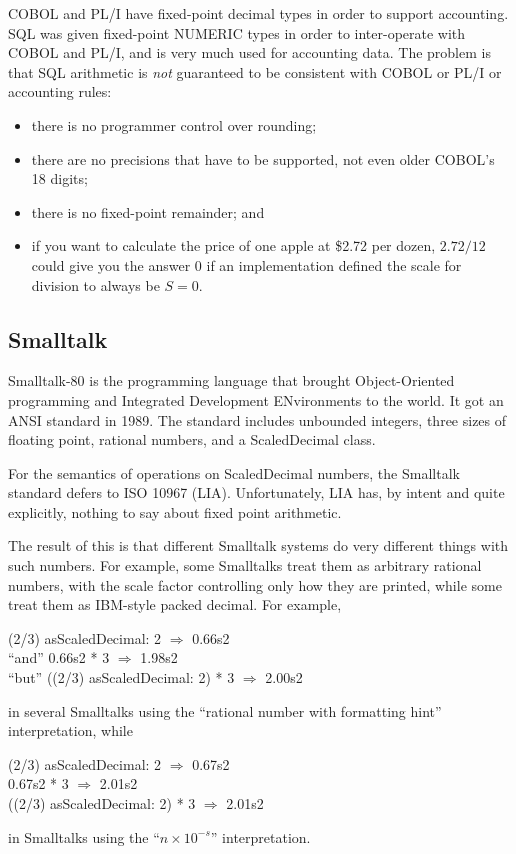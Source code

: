 \documentclass{article}
\begin{document}
COBOL and PL/I have fixed-point decimal types in order to support
accounting.
SQL was given fixed-point NUMERIC types in order to inter-operate
with COBOL and PL/I, and is very much used for accounting data.
The problem is that SQL arithmetic is {\it not} guaranteed
to be consistent with COBOL or PL/I or accounting rules:
\begin{itemize}
\item there is no programmer control over rounding;
\item there are no precisions that have to be supported,
not even older COBOL's 18 digits;
\item there is no fixed-point remainder; and
\item if you want to calculate the price of one
apple at \$2.72 per dozen, $2.72/12$ could give
you the answer 0 if an implementation defined the
scale for division to always be $S=0$.
\end{itemize}

\subsection{Smalltalk}

Smalltalk-80 is the programming language that brought Object-Oriented
programming and Integrated Development ENvironments to the world.
It got an ANSI standard in 1989.  The standard includes unbounded
integers, three sizes of floating point, rational numbers, and
a ScaledDecimal class.

For the semantics of operations on ScaledDecimal numbers,
the Smalltalk standard defers to ISO 10967 (LIA).  Unfortunately, LIA has,
by intent and quite explicitly, nothing to say about fixed point
arithmetic.

The result of this is that different Smalltalk systems do very
different things with such numbers.  For example, some Smalltalks
treat them as arbitrary rational numbers, with the scale factor
controlling only how they are printed, while some treat them as
IBM-style packed decimal.  For example,
\begin{tabbing}
(2/3) asScaledDecimal: 2 $\Longrightarrow$ 0.66s2\\
``and'' 0.66s2 * 3 $\Longrightarrow$ 1.98s2\\
``but'' ((2/3) asScaledDecimal: 2) * 3 $\Longrightarrow$ 2.00s2
\end{tabbing}
in several Smalltalks using the ``rational number with formatting hint''
interpretation, while
\begin{tabbing}
(2/3) asScaledDecimal: 2 $\Longrightarrow$ 0.67s2\\
0.67s2 * 3 $\Longrightarrow$ 2.01s2\\
((2/3) asScaledDecimal: 2) * 3 $\Longrightarrow$ 2.01s2
\end{tabbing}
in Smalltalks using the ``$n\times 10^{-s}$'' interpretation.
\end{document}
